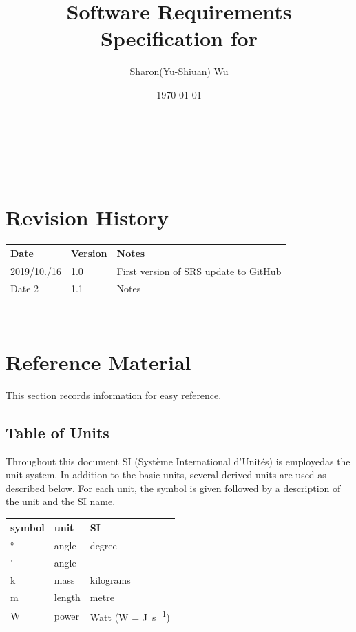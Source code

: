 \documentclass[12pt]{article}
\begin{document}
\title{Software Requirements Specification for \progname} 
\author{Sharon(Yu-Shiuan) Wu}
\date{\today}
	
\maketitle

~\newpage


\tableofcontents

~\newpage

\section*{Revision History}

\begin{tabularx}{\textwidth}{p{3cm}p{2cm}X}
\toprule {\bf Date} & {\bf Version} & {\bf Notes}\\
\midrule
2019/10./16 & 1.0 & First version of SRS update to GitHub\\
Date 2 & 1.1 & Notes\\
\bottomrule
\end{tabularx}

~\newpage

\section{Reference Material}

This section records information for easy reference.

\subsection{Table of Units}

Throughout this document SI (Syst\`{e}me International d'Unit\'{e}s) is
employedas the unit system. In addition to the basic units, several derived
units are used as described below.  For each unit, the symbol is given 
followed by a description of the unit and the SI name.
~\newline

\renewcommand{\arraystretch}{1.2}
  \noindent \begin{tabular}{l l l} 
    \toprule		
    \textbf{symbol} & \textbf{unit} & \textbf{SI}\\
    \midrule 
    \si{\degree} & angle & degree\\
    \si{'} & angle	& - \\
    \si{k} & mass   & kilograms\\
    \si{m} &  length   & metre \\
    \si{\watt} & power & Watt (W = \si{\joule\per\second})\\
    \bottomrule
  \end{tabular}
\end{document}
